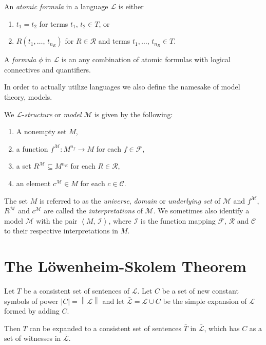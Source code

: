 \documentclass[../../main.tex]{subfiles}
\begin{document}
\begin{definition}
    An \textit{atomic formula} in a language $\mathcal{L}$ is either
    \begin{enumerate}
        \item $t_1 = t_2$ for terms $t_1,\, t_2 \in T$, or   
        \item $R(t_1,\ldots,\, t_{n_R})$ for $R \in \mathcal{R}$ and terms $t_1,\ldots,\, t_{n_R} \in T$.
    \end{enumerate}
    A \textit{formula} $\phi$ in $\mathcal{L}$ is an any combination of atomic formulas with logical connectives and quantifiers.
\end{definition}

In order to actually utilize languages we also define the namesake of model theory, models.

\begin{definition}\cite[Definition 1.1.2]{Mar02}
    We $\mathcal{L}$-\textit{structure} or \textit{model} $\mathcal{M}$ is given by the following:
    \begin{enumerate}
        \item A nonempty set $M$,
        \item a function $f^{\mathcal{M}}: M^{n_f} \to M$ for each $f \in \mathcal{F}$,
        \item a set $R^\mathcal{M} \subseteq M^{n_R}$ for each $R \in \mathcal{R}$,
        \item an element $c^\mathcal{M} \in M$ for each $c \in \mathcal{C}$.
    \end{enumerate}
    The set $M$ is referred to as the \textit{universe}, \textit{domain} or \textit{underlying set} of $\mathcal{M}$ 
    and $f^{\mathcal{M}}$, $R^{\mathcal{M}}$ and $c^{\mathcal{M}}$ are called the \textit{interpretations} of $\mathcal{M}$.
    We sometimes also identify a model $\mathcal{M}$ with the pair $\left<M,\, \mathcal{I}\right>$, 
    where $\mathcal{I}$ is the function mapping $\mathcal{F}$, $\mathcal{R}$ and $\mathcal{C}$ to their respective interpretations in $M$.
\end{definition}

\section{The Löwenheim-Skolem Theorem}

\begin{lemma}\cite[Lemma 2.1.1]{Cha90}
    Let $T$ be a consistent set of sentences of $\mathcal{L}$.  
    Let $C$ be a set of new constant symbols of power $\left\lvert C \right\rvert = \left\lVert \mathcal{L} \right\rVert$
     and let $\bar{\mathcal{L}} = \mathcal{L} \cup C$ be the simple expansion of $\mathcal{L}$ formed by adding $C$.
    
     Then $T$ can be expanded to a consistent set of sentences $\bar{T}$ in $\bar{\mathcal{L}}$, which has $C$ as a set of witnesses in $\bar{\mathcal{L}}$.
\end{lemma}
\end{document}
